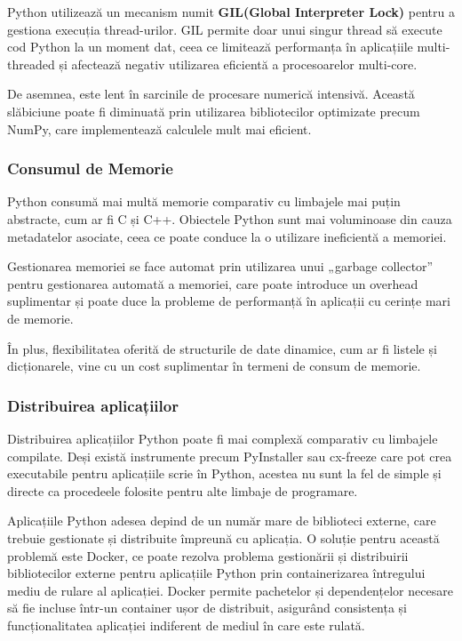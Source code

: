 Python utilizează un mecanism numit \textbf{GIL(Global Interpreter Lock)} pentru a gestiona execuția thread-urilor. GIL permite doar unui singur thread să execute cod Python la un moment dat, ceea ce limitează performanța în aplicațiile multi-threaded și afectează negativ utilizarea eficientă a procesoarelor multi-core.

De asemnea, este lent în sarcinile de procesare numerică intensivă. Această slăbiciune poate fi diminuată prin utilizarea bibliotecilor optimizate precum NumPy, care implementează calculele mult mai eficient.

\subsubsection{Consumul de Memorie}

Python consumă mai multă memorie comparativ cu limbajele mai puțin abstracte, cum ar fi C și C++. Obiectele Python sunt mai voluminoase din cauza metadatelor asociate, ceea ce poate conduce la o utilizare ineficientă a memoriei.

Gestionarea memoriei se face automat prin utilizarea unui „garbage collector” pentru gestionarea automată a memoriei, care poate introduce un overhead suplimentar și poate duce la probleme de performanță în aplicații cu cerințe mari de memorie.

În plus, flexibilitatea oferită de structurile de date dinamice, cum ar fi listele și dicționarele, vine cu un cost suplimentar în termeni de consum de memorie.

\subsubsection{Distribuirea aplicațiilor}

Distribuirea aplicațiilor Python poate fi mai complexă comparativ cu limbajele compilate. Deși există instrumente precum PyInstaller sau cx-freeze care pot crea executabile pentru aplicațiile scrie în Python, acestea nu sunt la fel de simple și directe ca procedeele folosite pentru alte limbaje de programare. 

Aplicațiile Python adesea depind de un număr mare de biblioteci externe, care trebuie gestionate și distribuite împreună cu aplicația. O soluție pentru această problemă este Docker, ce poate rezolva problema gestionării și distribuirii bibliotecilor externe pentru aplicațiile Python prin containerizarea întregului mediu de rulare al aplicației. Docker permite pachetelor și dependențelor necesare să fie incluse într-un container ușor de distribuit, asigurând consistența și funcționalitatea aplicației indiferent de mediul în care este rulată.

